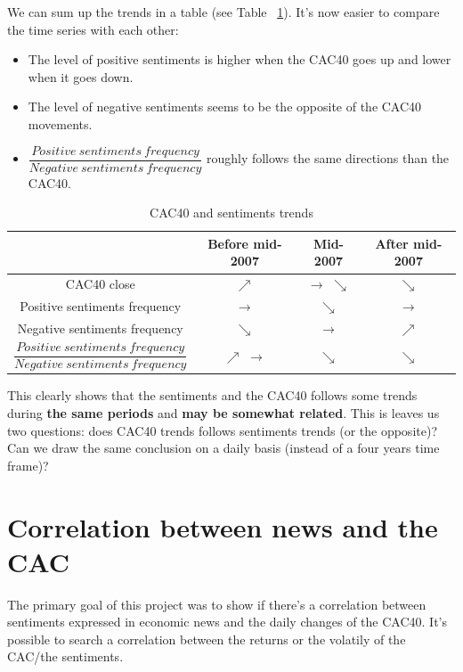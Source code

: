 \documentclass[12pt]{report}
\begin{document}
			 We can sum up the trends in a table (see Table ~\ref{trends}). It's now easier to compare the time series with each other:
			 \begin{itemize}
			 	\item The level of positive sentiments is higher when the CAC40 goes up and lower when it goes down.
			 	\item The level of negative sentiments seems to be the opposite of the CAC40 movements.
			 	\item $\dfrac{Positive\ sentiments\ frequency}{Negative\ sentiments\ frequency}$ roughly follows the same directions than the CAC40.
			 \end{itemize}

			\begin{center}
			\begin{table}
			\begin{tabular}{|c | c | c | c|}
				\hline
				& Before mid-2007 & Mid-2007 & After mid-2007\\
				\hline
				CAC40 close & $\nearrow$ & $\rightarrow$ $\searrow$ & $\searrow$\\
				\hline
				Positive sentiments frequency & $\rightarrow$ & $\searrow$ & $\rightarrow$\\
				\hline
				Negative sentiments frequency & $\searrow$ & $\rightarrow$ & $\nearrow$\\
				\hline
				$\dfrac{Positive\ sentiments\ frequency}{Negative\ sentiments\ frequency}$ & $\nearrow$ $\rightarrow$ & $\searrow$ & $\searrow$\\
				\hline
			\end{tabular}
			\caption{CAC40 and sentiments trends\label{trends}}
			\end{table}
			\end{center}
			
			This clearly shows that the sentiments and the CAC40 follows some trends during \textbf{the same periods} and \textbf{may be somewhat related}. This is leaves us two questions: does CAC40 trends follows sentiments trends (or the opposite)? Can we draw the same conclusion on a daily basis (instead of a four years time frame)?

		\section{Correlation between news and the CAC}

			The primary goal of this project was to show if there's a correlation between sentiments expressed in economic news and the daily changes of the CAC40. It's possible to search a correlation between the returns or the volatily of the CAC/the sentiments.
			
\end{document}
